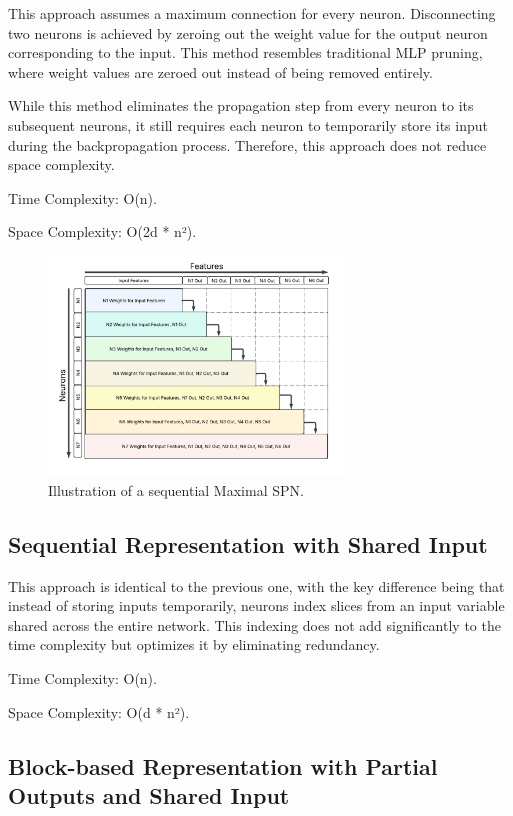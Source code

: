 This approach assumes a maximum connection for every neuron. Disconnecting two neurons is achieved by zeroing out the weight value for the output neuron corresponding to the input. This method resembles traditional MLP pruning, where weight values are zeroed out instead of being removed entirely.

While this method eliminates the propagation step from every neuron to its subsequent neurons, it still requires each neuron to temporarily store its input during the backpropagation process. Therefore, this approach does not reduce space complexity.

Time Complexity: O(n).

Space Complexity: O(2d * n²).

\begin{figure}[ht]
\centering
\includegraphics[width=0.7\textwidth]{Figures/Methodology/Neuron_Based_Maximal_SPN_Weights.png}
\caption{Illustration of a sequential Maximal SPN.}
\label{fig:seqMaxSpn}
\end{figure}

\subsection{Sequential Representation with Shared Input}
This approach is identical to the previous one, with the key difference being that instead of storing inputs temporarily, neurons index slices from an input variable shared across the entire network. This indexing does not add significantly to the time complexity but optimizes it by eliminating redundancy.

Time Complexity: O(n).

Space Complexity: O(d * n²).


\subsection{Block-based Representation with Partial Outputs and Shared Input}

